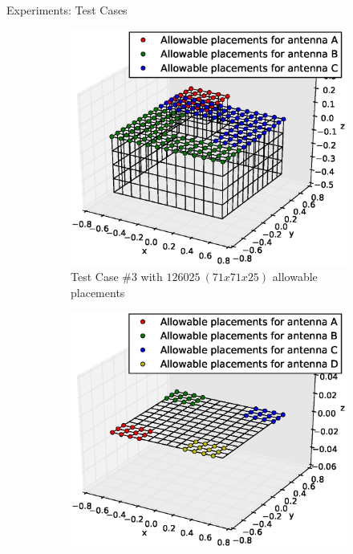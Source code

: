 \documentclass{beamer}
\begin{document}
\begin{frame}{Experiments: Test Cases}
    \begin{figure}
        \centering
        \begin{subfigure}{.5\columnwidth}
            \includegraphics[width=\columnwidth,height=\columnwidth]{../paper/FIG/tc3_figure}%
            \caption*{\tiny Test Case \#3 with $126025~(71x71x25)$ allowable placements}%
        \end{subfigure}\hfill%
        \begin{subfigure}{.5\columnwidth}
            \includegraphics[width=\columnwidth, height=\columnwidth]{../paper/FIG/tc4_figure}%

\end{subfigure}
\end{figure}
\end{frame}
\end{document}
